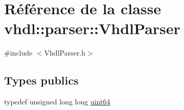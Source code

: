 \hypertarget{classvhdl_1_1parser_1_1_vhdl_parser}{}\section{Référence de la classe vhdl\+:\+:parser\+:\+:Vhdl\+Parser}
\label{classvhdl_1_1parser_1_1_vhdl_parser}


{\ttfamily \#include $<$Vhdl\+Parser.\+h$>$}

\subsection*{Types publics}
\begin{DoxyCompactItemize}
\item 
typedef unsigned long long \hyperlink{classvhdl_1_1parser_1_1_vhdl_parser_a95f5e79c79601054e289aadc9bafa413}{uint64}
\end{DoxyCompactItemize}
